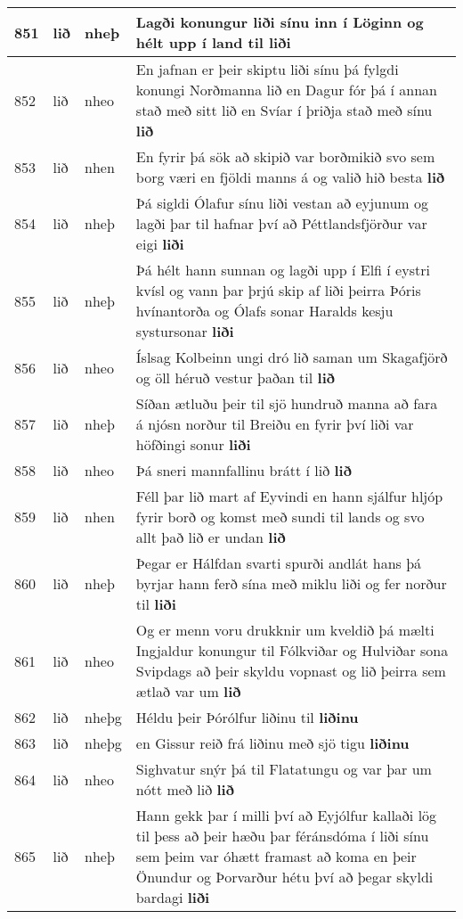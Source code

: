 \documentclass{article}
\begin{document}
\begin{longtable}{p{1cm}|p{1cm}|p{1cm}|p{13cm}}
\hline
851&lið&nheþ&Lagði konungur liði sínu inn í Löginn og hélt upp í land til \textbf{liði} \\
\hline
852&lið&nheo&En jafnan er þeir skiptu liði sínu þá fylgdi konungi Norðmanna lið en Dagur fór þá í annan stað með sitt lið en Svíar í þriðja stað með sínu \textbf{lið} \\
\hline
853&lið&nhen&En fyrir þá sök að skipið var borðmikið svo sem borg væri en fjöldi manns á og valið hið besta \textbf{lið} \\
\hline
854&lið&nheþ&Þá sigldi Ólafur sínu liði vestan að eyjunum og lagði þar til hafnar því að Péttlandsfjörður var eigi \textbf{liði} \\
\hline
855&lið&nheþ&Þá hélt hann sunnan og lagði upp í Elfi í eystri kvísl og vann þar þrjú skip af liði þeirra Þóris hvínantorða og Ólafs sonar Haralds kesju systursonar \textbf{liði} \\
\hline
856&lið&nheo&Íslsag Kolbeinn ungi dró lið saman um Skagafjörð og öll héruð vestur þaðan til \textbf{lið} \\
\hline
857&lið&nheþ&Síðan ætluðu þeir til sjö hundruð manna að fara á njósn norður til Breiðu en fyrir því liði var höfðingi sonur \textbf{liði} \\
\hline
858&lið&nheo&Þá sneri mannfallinu brátt í lið \textbf{lið} \\
\hline
859&lið&nhen&Féll þar lið mart af Eyvindi en hann sjálfur hljóp fyrir borð og komst með sundi til lands og svo allt það lið er undan \textbf{lið} \\
\hline
860&lið&nheþ&Þegar er Hálfdan svarti spurði andlát hans þá byrjar hann ferð sína með miklu liði og fer norður til \textbf{liði} \\
\hline
861&lið&nheo&Og er menn voru drukknir um kveldið þá mælti Ingjaldur konungur til Fólkviðar og Hulviðar sona Svipdags að þeir skyldu vopnast og lið þeirra sem ætlað var um \textbf{lið} \\
\hline
862&lið&nheþg&Héldu þeir Þórólfur liðinu til \textbf{liðinu} \\
\hline
863&lið&nheþg&en Gissur reið frá liðinu með sjö tigu \textbf{liðinu} \\
\hline
864&lið&nheo&Sighvatur snýr þá til Flatatungu og var þar um nótt með lið \textbf{lið} \\
\hline
865&lið&nheþ&Hann gekk þar í milli því að Eyjólfur kallaði lög til þess að þeir hæðu þar féránsdóma í liði sínu sem þeim var óhætt framast að koma en þeir Önundur og Þorvarður hétu því að þegar skyldi bardagi \textbf{liði} \\

\end{longtable}
\end{document}
